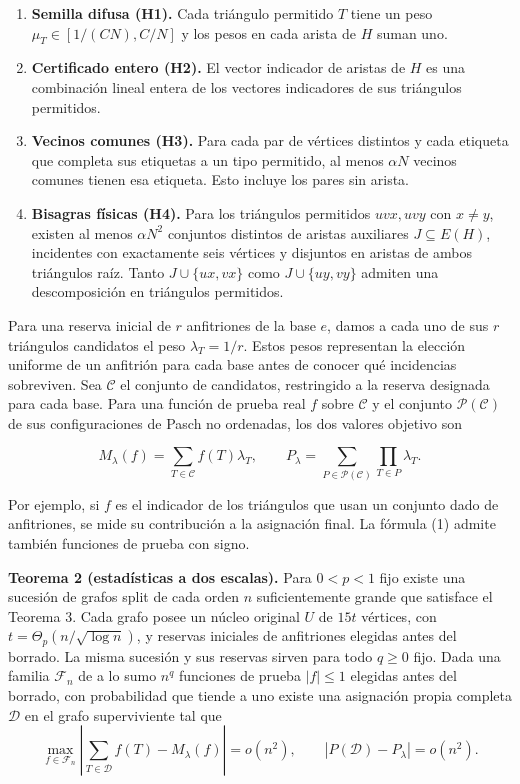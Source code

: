 \documentclass[spanish,11pt,a4paper]{article}
\providecommand{\tightlist}{\setlength{\itemsep}{0pt}\setlength{\parskip}{0pt}}
\begin{document}
\begin{enumerate}
\def\labelenumi{\arabic{enumi}.}
\tightlist
\item
  \textbf{Semilla difusa (H1).} Cada triángulo permitido \(T\) tiene un peso \(\mu_T\in[1/(CN),C/N]\) y los pesos en cada arista de \(H\) suman uno.
\item
  \textbf{Certificado entero (H2).} El vector indicador de aristas de \(H\) es una combinación lineal entera de los vectores indicadores de sus triángulos permitidos.
\item
  \textbf{Vecinos comunes (H3).} Para cada par de vértices distintos y cada etiqueta que completa sus etiquetas a un tipo permitido, al menos \(\alpha N\) vecinos comunes tienen esa etiqueta. Esto incluye los pares sin arista.
\item
  \textbf{Bisagras físicas (H4).} Para los triángulos permitidos \(uvx,uvy\) con \(x\ne y\), existen al menos \(\alpha N^2\) conjuntos distintos de aristas auxiliares \(J\subseteq E(H)\), incidentes con exactamente seis vértices y disjuntos en aristas de ambos triángulos raíz. Tanto \(J\cup\{ux,vx\}\) como \(J\cup\{uy,vy\}\) admiten una descomposición en triángulos permitidos.
\end{enumerate}

Para una reserva inicial de \(r\) anfitriones de la base \(e\), damos a cada uno de sus \(r\) triángulos candidatos el peso \(\lambda_T=1/r\). Estos pesos representan la elección uniforme de un anfitrión para cada base antes de conocer qué incidencias sobreviven. Sea \(\mathcal C\) el conjunto de candidatos, restringido a la reserva designada para cada base. Para una función de prueba real \(f\) sobre \(\mathcal C\) y el conjunto \(\mathcal P(\mathcal C)\) de sus configuraciones de Pasch no ordenadas, los dos valores objetivo son

\[M_\lambda(f)=\sum_{T\in\mathcal C} f(T)\lambda_T,\qquad
P_\lambda=\sum_{P\in\mathcal P(\mathcal C)}\prod_{T\in P}\lambda_T.
\tag{1}\]

Por ejemplo, si \(f\) es el indicador de los triángulos que usan un conjunto dado de anfitriones, se mide su contribución a la asignación final. La fórmula (1) admite también funciones de prueba con signo.

\textbf{Teorema 2 (estadísticas a dos escalas).} Para \(0<p<1\) fijo existe una sucesión de grafos split de cada orden \(n\) suficientemente grande que satisface el Teorema 3. Cada grafo posee un núcleo original \(U\) de \(15t\) vértices, con \(t=\Theta_p(n/\sqrt{\log n})\), y reservas iniciales de anfitriones elegidas antes del borrado. La misma sucesión y sus reservas sirven para todo \(q\ge0\) fijo. Dada una familia \(\mathcal F_n\) de a lo sumo \(n^q\) funciones de prueba \(|f|\le1\) elegidas antes del borrado, con probabilidad que tiende a uno existe una asignación propia completa \(\mathcal D\) en el grafo superviviente tal que \[\max_{f\in\mathcal F_n}\left|\sum_{T\in\mathcal D}f(T)-M_\lambda(f)\right|=o(n^2),
\qquad |P(\mathcal D)-P_\lambda|=o(n^2).
\tag{2}\]
\end{document}
